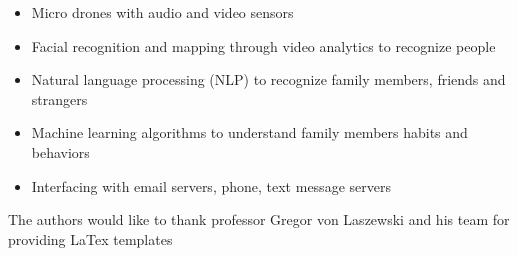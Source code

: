 \documentclass[sigconf]{acmart}
\begin{document}
\begin{itemize}
  
\item Micro drones with audio and video sensors

\item Facial recognition and mapping through video analytics to recognize people
	
\item Natural language processing (NLP) to recognize family members, friends and strangers

\item Machine learning algorithms to understand family members habits and behaviors

\item Interfacing with email servers, phone, text message servers

\end{itemize}

\begin{acks}
The authors would like to thank professor Gregor von Laszewski and his team for providing LaTex templates
\end{acks}


 
\end{document}
